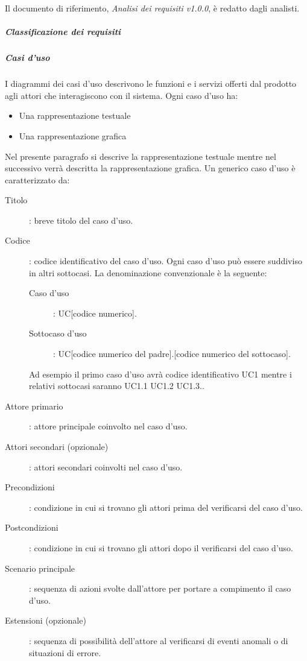 \documentclass[../norme-di-progetto.tex]{subfiles}
\begin{document}
Il documento di riferimento, \textit{Analisi dei requisiti v1.0.0}, è redatto dagli analisti.

\subparagraph{Classificazione dei requisiti}%
\label{subp:classificazione_dei_requisiti}

\subparagraph{Casi d'uso}%
\label{subp:casi_d'uso}
 I diagrammi dei casi d'uso descrivono le funzioni e i servizi offerti dal prodotto agli attori che interagiscono con il sistema. Ogni caso d'uso ha:

\begin{itemize}
  \item Una rappresentazione testuale
  \item Una rappresentazione grafica
\end{itemize}

Nel presente paragrafo si descrive la rappresentazione testuale mentre nel successivo verrà descritta la rappresentazione grafica. Un generico caso d'uso è caratterizzato da:
\begin{description}
\item [Titolo]: breve titolo del caso d'uso.
\item [Codice]: codice identificativo del caso d'uso. Ogni caso d'uso può essere suddiviso in altri sottocasi. La denominazione convenzionale è la seguente:
\begin{description}
  \item [Caso d'uso]: UC[codice numerico].
    \item [Sottocaso d'uso]: UC[codice numerico del padre].[codice numerico del sottocaso].
\end{description}
Ad esempio il primo caso d'uso avrà codice identificativo UC1 mentre i relativi sottocasi saranno UC1.1 UC1.2 UC1.3..
\item [Attore primario]: attore principale coinvolto nel caso d'uso.
\item [Attori secondari (opzionale)]: attori secondari coinvolti nel caso d'uso.
\item [Precondizioni]: condizione in cui si trovano gli attori prima del verificarsi del caso d'uso.
\item [Postcondizioni]: condizione in cui si trovano gli attori dopo il verificarsi del caso d'uso.
\item [Scenario principale]: sequenza di azioni svolte dall'attore per portare a compimento il caso d'uso.
\item [Estensioni (opzionale)]: sequenza di possibilità dell'attore al verificarsi di eventi anomali o di situazioni di errore.
\end{description}
\end{document}

